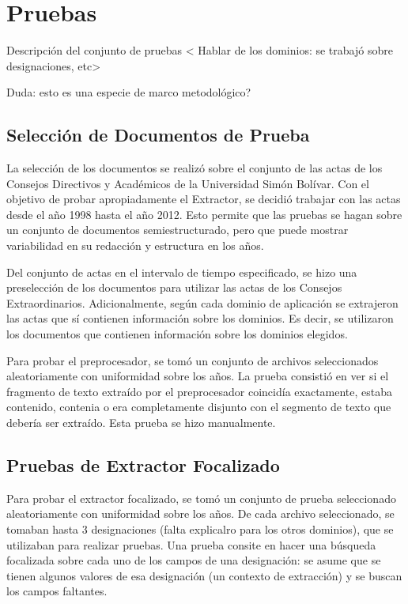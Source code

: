 \chapter{Pruebas} \label{chap:pruebas}

Descripción del conjunto de pruebas < Hablar de los dominios: se trabajó sobre designaciones, etc>

Duda: esto es una especie de marco metodológico?

\section{Selección de Documentos de Prueba}

La selección de los documentos se realizó sobre el conjunto de las actas de los Consejos Directivos y Académicos de la Universidad Simón Bolívar. Con el objetivo de probar apropiadamente el Extractor, se decidió trabajar con las actas desde el año 1998 hasta el año 2012. Esto permite que las pruebas se hagan sobre un conjunto de documentos semiestructurado, pero que puede mostrar variabilidad en su redacción y estructura en los años.

Del conjunto de actas en el intervalo de tiempo especificado, se hizo una preselección de los documentos para utilizar las actas de los Consejos Extraordinarios. Adicionalmente, según cada dominio de aplicación se extrajeron las actas que sí contienen información sobre los dominios. Es decir, se utilizaron los documentos que contienen información sobre los dominios elegidos.

Para probar el preprocesador, se tomó un conjunto de archivos seleccionados aleatoriamente con uniformidad sobre los años. La prueba consistió en ver si el fragmento de texto extraído por el preprocesador coincidía exactamente, estaba contenido, contenia o era completamente disjunto con el segmento de texto que debería ser extraído. Esta prueba se hizo manualmente. 

\section{Pruebas de Extractor Focalizado}

Para probar el extractor focalizado, se tomó un conjunto de prueba seleccionado aleatoriamente con uniformidad sobre los años. De cada archivo seleccionado, se tomaban hasta 3 designaciones (falta explicalro para los otros dominios), que se utilizaban para realizar pruebas. Una prueba consite en hacer una búsqueda focalizada sobre cada uno de los campos de una designación: se asume que se tienen algunos valores de esa designación (un contexto de extracción) y se buscan los campos faltantes. 

